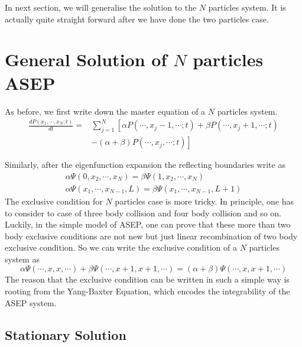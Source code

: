 \documentclass[12pt,a4paper]{article}
\begin{document}
In next section, we will generalise the solution to the $N$ particles system.
It is actually quite straight forward after we have done the two particles
case. 


\section{General Solution of $N$ particles ASEP}
\label{sec:general_solution_of_n_particles_asep}

As before, we first write down the master equation of a $N$ particles system.
\begin{equation}
    \begin{aligned}
        \label{eq:masterEqN}
        \frac{d P(x_1, \cdots, x_N; t)}{dt} = & \sum_{j=1}^N \left[\alpha
            P(\cdots,x_j-1,\cdots;t) + \beta P(\cdots, x_j+1, \cdots;t)\right. \\ 
        & \left.- (\alpha+\beta)P(\cdots, x_j, \cdots; t)\right]
    \end{aligned}
\end{equation}

Similarly, after the eigenfunction expansion the reflecting boundaries write as
\begin{subequations}
    \label{eq:boundaries-N-particles}
    \begin{eqnarray}
        \alpha \Psi(0,x_2,\cdots,x_N) = \beta \Psi(1, x_2,\cdots, x_N) \\
        \alpha \Psi(x_1,\cdots, x_{N-1}, L) = \beta \Psi(x_1,\cdots, x_{N-1}, L+1)
    \end{eqnarray}
\end{subequations}
The exclusive condition for $N$ particles case is more tricky. In principle,
one has to consider to case of three body collision and four body collision and
so on. Luckily, in the simple model of ASEP, one can prove that these more than
two body exclusive conditions are not new but just linear recombination of two
body exclusive condition. So we can write the exclusive condition of a $N$
particles system as 
\begin{equation}
    \label{eq:exclusionConditionN}
    \alpha \Psi(\cdots,x, x,\cdots) + \beta \Psi(\cdots, x+1, x+1, \cdots) 
    = (\alpha + \beta) \Psi(\cdots, x, x+1, \cdots)
\end{equation}
The reason that the exclusive condition can be written in such a simple way is
rooting from the Yang-Baxter Equation, which encodes the integrability of the
ASEP system.

\subsection{Stationary Solution}
\label{sub:stationary_solution}
\end{document}
